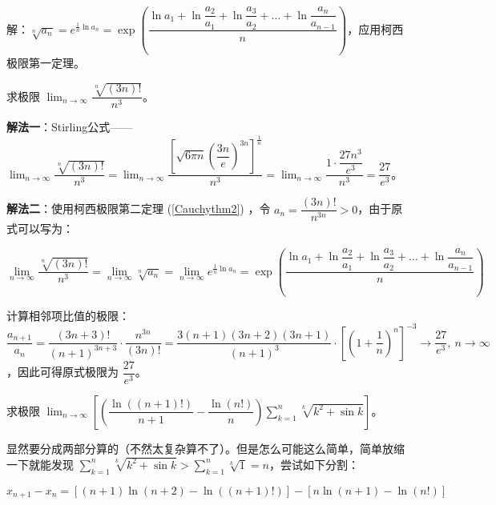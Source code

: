 解：$\displaystyle \sqrt[n]{a_n} =  e^{\frac{1}{n} \ln a_n}= \exp\left( {\dfrac{\ln a_1 + \ln \dfrac{a_2}{a_1} + \ln \dfrac{a_3}{a_2} + \dots + \ln \dfrac{a_n}{a_{n-1}}}{n}} \right)$，应用柯西极限第一定理。

\begin{problem}

求极限 $\displaystyle \lim_{n \to \infty} \dfrac{\sqrt[n]{(3n)!}}{n^3}$。

\end{problem}

\noindent\textbf{解法一}：Stirling公式——$\displaystyle \lim_{n \to \infty} \dfrac{\sqrt[n]{(3n)!}}{n^3} = \lim_{n \to \infty} \dfrac{\left[ \sqrt{6\pi n} \left( \dfrac{3n}{e} \right)^{3n} \right]^{\frac{1}{n}}}{n^3}=\displaystyle \lim_{n \to \infty} \dfrac{1 \cdot \dfrac{27n^3}{e^3}}{n^3} = \dfrac{27}{e^3}$。

\noindent\textbf{解法二}：使用柯西极限第二定理 (\ref{Cauchythm2}) ，令 $\displaystyle a_n = \dfrac{(3n)!}{n^{3n}} > 0$，由于原式可以写为：

$$
\displaystyle \lim_{n \to \infty} \dfrac{\sqrt[n]{(3n)!}}{n^3}=\lim_{n \to \infty} \sqrt[n]{a_n} = \lim_{n \to \infty} e^{\frac{1}{n} \ln a_n} = \exp\left( {\dfrac{\ln a_1 + \ln \dfrac{a_2}{a_1} + \ln \dfrac{a_3}{a_2} + \dots + \ln \dfrac{a_n}{a_{n-1}}}{n}} \right)
$$

计算相邻项比值的极限：$\displaystyle \dfrac{a_{n+1}}{a_n} = \dfrac{(3n+3)!}{(n+1)^{3n+3}} \cdot \dfrac{n^{3n}}{(3n)!}= \dfrac{3(n+1)(3n+2)(3n+1)}{(n+1)^3} \cdot \left[ \left( 1 + \dfrac{1}{n} \right)^n \right]^{-3}\to \dfrac{27}{e^3},\ n\to \infty$，因此可得原式极限为 $\displaystyle \dfrac{27}{e^3}$。

\begin{exercise}

\label{exercisemryt4}求极限 $\displaystyle \lim_{n \to \infty} \left[ \left( \dfrac{\ln((n+1)!)}{n+1} - \dfrac{\ln(n!)}{n} \right) \sum_{k=1}^n \sqrt[k]{k^2 + \sin k} \right]$。

\end{exercise}

显然要分成两部分算的（不然太复杂算不了）。但是怎么可能这么简单，简单放缩一下就能发现 $\displaystyle \sum_{k=1}^n \sqrt[k]{k^2 + \sin k}>\sum_{k=1}^n \sqrt[k]{1}=n$，尝试如下分割：

$$
\displaystyle x_{n+1} - x_n = \left[ (n+1) \ln(n+2) - \ln((n+1)!) \right] - \left[ n \ln(n+1) - \ln(n!) \right]
$$


